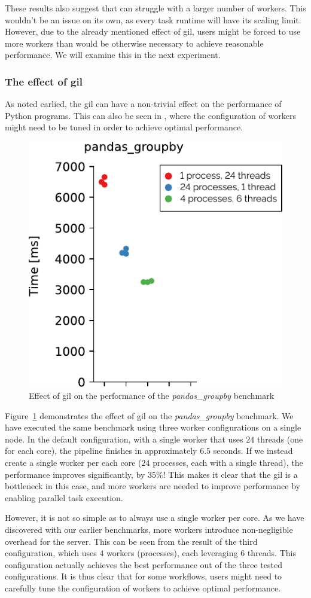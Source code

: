 These results also suggest that \dask{} can struggle with a larger number of
workers. This wouldn't be an issue on its own, as every task runtime will have its scaling limit.
However, due to the already mentioned effect of \gls{gil},
\dask{} users might be forced to use more workers than would be otherwise
necessary to achieve reasonable performance. We will examine this in the next experiment.

\subsubsection*{The effect of \gls{gil}}
As noted earlied, the \gls{gil} can have a non-trivial effect on the performance
of Python programs. This can also be seen in \dask{}, where the configuration
of workers might need to be tuned in order to achieve optimal performance.

\begin{figure}
	\centering
	\includegraphics[width=0.3\linewidth]{./imgs/rsds/charts/dask-gil-scaling}
	\caption{Effect of \gls{gil} on the performance of the \emph{pandas\_groupby} benchmark}
	\label{fig:dask-gil-scaling}
\end{figure}

Figure~\ref{fig:dask-gil-scaling} demonstrates the effect of \gls{gil} on the
\emph{pandas\_groupby} benchmark. We have executed the same benchmark using three
\dask{} worker configurations on a single node. In the default configuration,
with a single worker that uses $24$ threads (one for each core), the pipeline
finishes in approximately $6.5$ seconds. If we instead create a single worker
per each core ($24$ processes, each with a single thread), the performance
improves significantly, by $35\%$! This makes it clear that the
\gls{gil} is a bottleneck in this case, and more \dask{}
workers are needed to improve performance by enabling parallel task execution.

However, it is not so simple as to always use a single \dask{} worker per core.
As we have discovered with our earlier benchmarks, more workers introduce non-negligible overhead
for the \dask{} server. This can be seen from the result of the third
configuration, which uses $4$ \dask{} workers
(processes), each leveraging $6$ threads. This configuration actually
achieves the best performance out of the three tested configurations. It is thus clear that for
some \dask{} workflows, users might need to carefully tune the configuration of
workers to achieve optimal performance.

